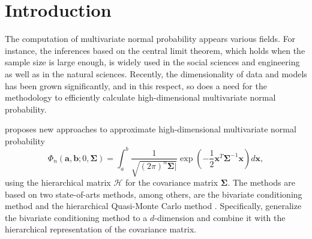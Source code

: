 \section{Introduction}

The computation of multivariate normal probability appears various fields. For instance, the inferences based on the central limit theorem, which holds when the sample size is large enough, is widely used in the social sciences and engineering as well as in the natural sciences. Recently, the dimensionality of data and models has been grown significantly, and in this respect, so does a need for the methodology to efficiently calculate high-dimensional multivariate normal probability.

\citet{cao2019hierarchical} proposes new approaches to approximate high-dimensional multivariate normal probability 
\begin{equation}\label{eqn:normalprob}
    \Phi_n(\mathbf{a}, \mathbf{b}; 0, \boldsymbol{\Sigma}) = \int_a^b \frac{1}{\sqrt{(2\pi)^n  \boldsymbol{\Sigma}|}} \exp\left( -\frac{1}{2} \mathbf{x}^T \boldsymbol{\Sigma}^{-1} \mathbf{x} \right) d\mathbf{x},
\end{equation}
using the hierarchical matrix $\mathcal{H}$ \citep{hackbusch2015hierarchical} for the covariance matrix $\boldsymbol{\Sigma}$. The methods are based on two state-of-arts methods, among others, are the bivariate conditioning method \citep{trinh2015bivariate} and the hierarchical Quasi-Monte Carlo method \citep{genton2018hierarchical}. Specifically, \citet{cao2019hierarchical} generalize the bivariate conditioning method to a $d$-dimension and combine it with the hierarchical representation of the covariance matrix. 

